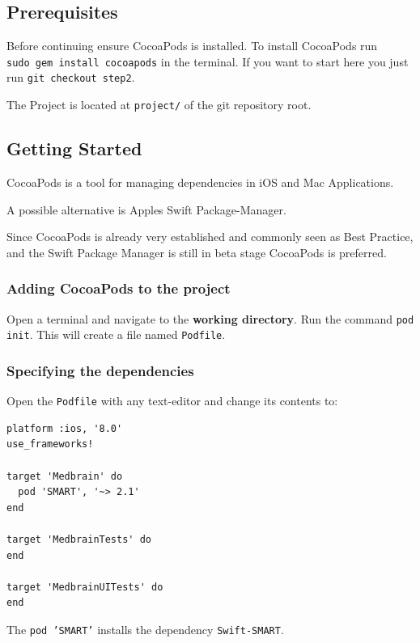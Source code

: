 \documentclass{article}
\begin{document}
\subsection{Prerequisites}\label{step2:prerequisites}

Before continuing ensure CocoaPods is installed.
To install CocoaPods run \texttt{sudo\ gem\ install\ cocoapods} in the terminal.
\newline
If you want to start here you just run \texttt{git\ checkout\ step2}.

The Project is located at \texttt{project/} of the git repository root.

\subsection{Getting Started}\label{step2:getting-started}

CocoaPods is a tool for managing dependencies in iOS and Mac Applications.

A possible alternative is Apples Swift Package-Manager\cite{swift-package-manager}.

Since CocoaPods is already very established and commonly seen as Best
Practice, and the Swift Package Manager is still in beta
stage CocoaPods is preferred.


\subsubsection{Adding CocoaPods to the project}
Open a terminal and navigate to the \textbf{working directory}.
Run the command \texttt{pod init}.
This will create a file named \texttt{Podfile}.

\subsubsection{Specifying the dependencies}
Open the \texttt{Podfile} with any text-editor and change its contents to:

\begin{verbatim}
platform :ios, '8.0'
use_frameworks!

target 'Medbrain' do
  pod 'SMART', '~> 2.1'
end

target 'MedbrainTests' do
end

target 'MedbrainUITests' do
end
\end{verbatim}

The \texttt{pod\ 'SMART'} installs the dependency \texttt{Swift-SMART}\cite{swift-smart}.
\end{document}

